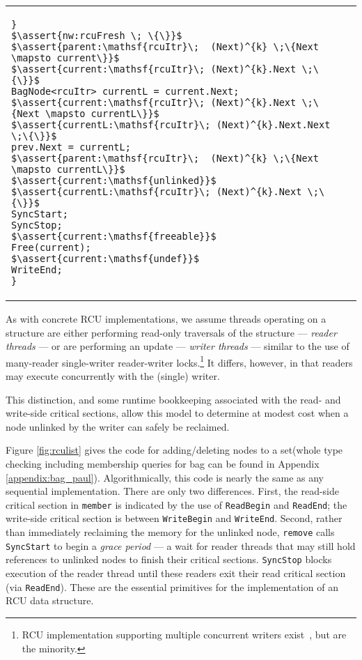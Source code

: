 \begin{figure*}[t!]
\begin{tabular}{p{}p{}}
\begin{lstlisting}[basicstyle=\scriptsize\ttfamily]
}
$\assert{nw:rcuFresh \; \{\}}$
$\assert{parent:\mathsf{rcuItr}\;  (Next)^{k} \;\{Next \mapsto current\}}$
$\assert{current:\mathsf{rcuItr}\; (Next)^{k}.Next \;\{\}}$
BagNode<rcuItr> currentL = current.Next;
$\assert{current:\mathsf{rcuItr}\; (Next)^{k}.Next \;\{Next \mapsto currentL\}}$
$\assert{currentL:\mathsf{rcuItr}\; (Next)^{k}.Next.Next \;\{\}}$
prev.Next = currentL;
$\assert{parent:\mathsf{rcuItr}\;  (Next)^{k} \;\{Next \mapsto currentL\}}$
$\assert{current:\mathsf{unlinked}}$
$\assert{currentL:\mathsf{rcuItr}\; (Next)^{k}.Next \;\{\}}$
SyncStart;
SyncStop;
$\assert{current:\mathsf{freeable}}$
Free(current);
$\assert{current:\mathsf{undef}}$
WriteEnd;
}
\end{lstlisting}
\end{tabular}
\vspace{-2em}
\caption{Read-Copy-Update Client: Linked-List based Bag Implementation.}
\label{fig:rculist}
\end{figure*}

As with concrete RCU implementations, we assume threads operating on a structure are either performing read-only traversals of the structure --- \emph{reader threads} --- or are performing an update --- \emph{writer threads} --- similar to the use of many-reader single-writer reader-writer locks.\footnote{RCU implementation supporting multiple concurrent writers exist~\cite{Arbel:2014:CUR:2611462.2611471}, but are the minority.}  It differs, however, in that readers may execute concurrently with the (single) writer.

This distinction, and some runtime bookkeeping associated with the read- and write-side critical sections, allow this model to determine at modest cost when a node unlinked by the writer can safely be reclaimed.

Figure \ref{fig:rculist} gives the code for adding/deleting nodes to a set(whole type checking including membership queries for bag can be found in Appendix \ref{appendix:bag_paul}). Algorithmically, this code is nearly the same as any sequential implementation. There are only two differences.
First, the read-side critical section in \texttt{member} is indicated by the use of \lstinline|ReadBegin| and \lstinline|ReadEnd|; the write-side critical section is between \lstinline|WriteBegin| and \lstinline|WriteEnd|.
Second, rather than immediately reclaiming the memory for the unlinked node, \texttt{remove} calls \lstinline|SyncStart| to begin a \emph{grace period} --- a wait for reader threads that may still hold references to unlinked nodes to finish their critical sections.
 \lstinline|SyncStop| blocks execution of the reader thread until these readers exit their read critical section (via \lstinline|ReadEnd|). These are the essential primitives for the implementation of an RCU data structure.

